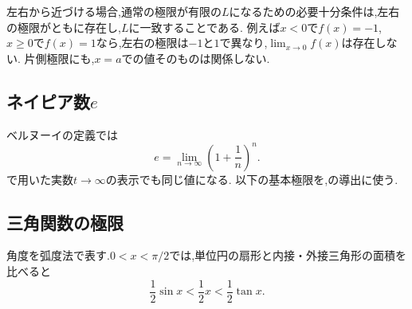     左右から近づける場合,通常の極限が有限の$L$になるための必要十分条件は,左右の極限がともに存在し,$L$に一致することである.
    例えば$x<0$で$f(x)=-1$,$x\ge0$で$f(x)=1$なら,左右の極限は$-1$と$1$で異なり,$\lim_{x\to0}f(x)$は存在しない.
    片側極限にも,$x=a$での値そのものは関係しない.

  \subsection{\texorpdfstring{ネイピア数$e$}{ネイピア数e}}\label{節：ネイピア数eの定義}
    ベルヌーイの定義では
    \[
      e=\lim_{n\to\infty}\left(1+\frac1n\right)^n.
    \]
    で用いた実数$t\to\infty$の表示でも同じ値になる.
    以下の基本極限を,の導出に使う.

  \subsection{三角関数の極限}\label{節：三角関数の基本極限}
    角度を弧度法で表す.$0<x<\pi/2$では,単位円の扇形と内接・外接三角形の面積を比べると
    \[
      \frac12\sin x<\frac12x<\frac12\tan x.
    \]
